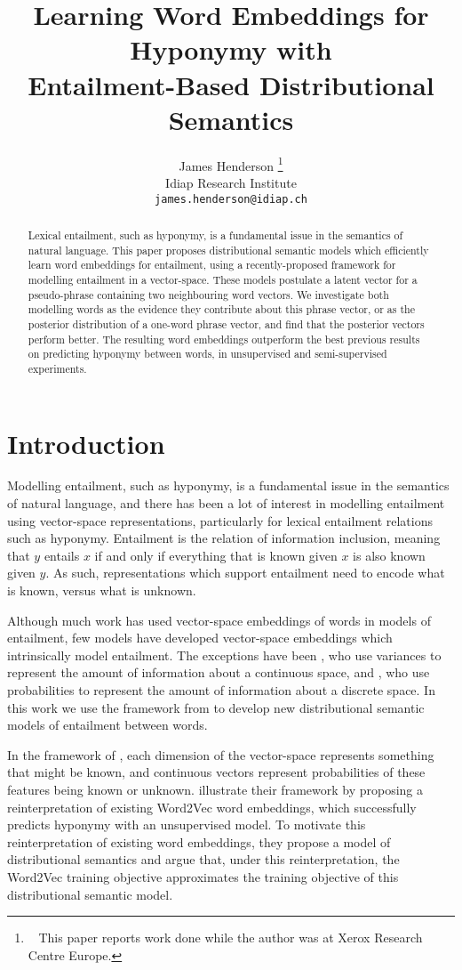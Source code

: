 \documentclass[11pt,a4paper]{article}
\title{ Learning Word Embeddings for Hyponymy with  \\
  Entailment-Based Distributional Semantics \\
}
\author{  James Henderson
  \thanks{~ This paper reports work done while the author was at 
    Xerox Research Centre Europe.} \\
  Idiap Research Institute \\
  {\tt james.henderson@idiap.ch} \\
}
\date{}
\begin{document}
\maketitle


\begin{abstract}
Lexical entailment, such as hyponymy, is a fundamental issue in the semantics
of natural language.  This paper proposes distributional semantic models which
efficiently learn word embeddings for entailment, using a recently-proposed
framework for modelling entailment in a vector-space.  These models postulate
a latent vector for a pseudo-phrase containing two neighbouring word vectors.
We investigate both modelling words as the evidence they contribute about this
phrase vector, or as the posterior distribution of a one-word phrase vector,
and find that the posterior vectors perform better.  The resulting word
embeddings outperform the best previous results on predicting hyponymy between
words, in unsupervised and semi-supervised experiments.
\end{abstract}


\section{Introduction}

Modelling entailment, such as hyponymy, is a fundamental issue in the
semantics of natural language, and there has been a lot of interest in
modelling entailment using vector-space representations, particularly for
lexical entailment relations such as hyponymy.  Entailment is the relation of
information inclusion, meaning that $y$ entails $x$ if and only if everything
that is known given $x$ is also known given $y$.  As such, representations
which support entailment need to encode what is known, versus what is unknown.

Although much work has used vector-space embeddings of words in models of
entailment, few models have developed vector-space embeddings which
intrinsically model entailment.  The exceptions have been \citet{Vilnis15},
who use variances to represent the amount of information about a continuous
space, and \citet{Henderson16_acl}, who use probabilities to represent the
amount of information about a discrete space.  In this work we use the
framework from \citet{Henderson16_acl} to develop new distributional semantic
models of entailment between words.

In the framework of \citet{Henderson16_acl}, each dimension of the
vector-space represents something that might be known, and continuous vectors
represent probabilities of these features being known or unknown.
\citet{Henderson16_acl} illustrate their framework by proposing a
reinterpretation of existing Word2Vec \citep{word2vec1} word embeddings, which
successfully predicts hyponymy with an unsupervised model.  To motivate this
reinterpretation of existing word embeddings, they propose a model of
distributional semantics and argue that, under this reinterpretation, the
Word2Vec training objective approximates the training objective of this
distributional semantic model.
\end{document}
